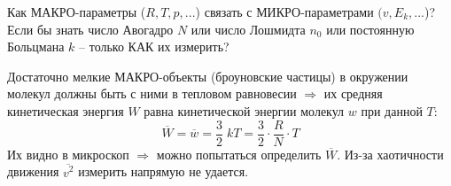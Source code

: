 \documentclass[12pt,epsfig,color,russian]{article}
\begin{document}
\sf\Large

Как МАКРО-параметры ($R,T,p,...$) связать с МИКРО-параметрами $(v,E_k,...$)? Если бы знать число Авогадро $N$ или число Лошмидта $n_0$ или постоянную Больцмана $k$ -- только КАК их измерить?

Достаточно мелкие МАКРО-объекты (броуновские частицы) в окру\-же\-нии молекул должны быть с ними в тепловом равновесии $\Rightarrow$ их средняя кинетическая энергия $W$ равна кинетической энергии молекул $w$ при дан\-ной $T$:\vspace{-3mm}
\begin{displaymath}
\overline{W}=\overline{w}=\frac32\;kT = \frac32\cdot\frac RN\cdot T
\end{displaymath}
Их видно в микроскоп $\Rightarrow$ можно попытаться определить $\overline{W}$. Из-за хао\-тич\-но\-с\-ти движения $\overline{v^2}$ измерить напрямую не удается.\\
\end{document}
